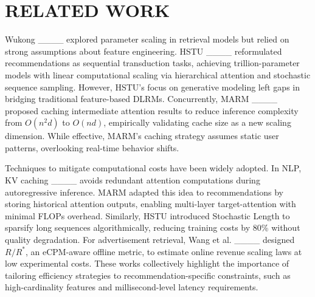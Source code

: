 \section{RELATED WORK}
Wukong ____ explored parameter scaling in retrieval models but relied on strong assumptions about feature engineering. HSTU ____ reformulated recommendations as sequential transduction tasks, achieving trillion-parameter models with linear computational scaling via hierarchical attention and stochastic sequence sampling. However, HSTU’s focus on generative modeling left gaps in bridging traditional feature-based DLRMs. Concurrently, MARM ____ proposed caching intermediate attention results to reduce inference complexity from ${O(n^2d)}$ to $O(nd)$, empirically validating cache size as a new scaling dimension. While effective, MARM’s caching strategy assumes static user patterns, overlooking real-time behavior shifts.

Techniques to mitigate computational costs have been widely adopted. In NLP, KV caching ____ avoids redundant attention computations during autoregressive inference. MARM adapted this idea to recommendations by storing historical attention outputs, enabling multi-layer target-attention with minimal FLOPs overhead. Similarly, HSTU introduced Stochastic Length to sparsify long sequences algorithmically, reducing training costs by 80\% without quality degradation. For advertisement retrieval, Wang et al. ____ designed $R/R^*$, an eCPM-aware offline metric, to estimate online revenue scaling laws at low experimental costs. These works collectively highlight the importance of tailoring efficiency strategies to recommendation-specific constraints, such as high-cardinality features and millisecond-level latency requirements.